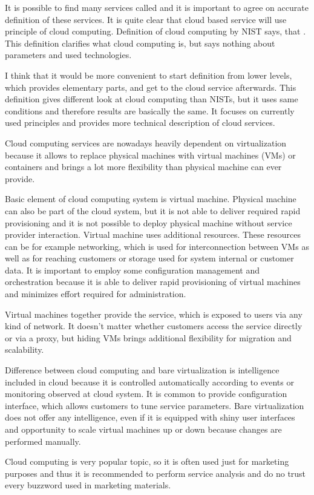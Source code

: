 
It is possible to find many services called  and it is important to agree on accurate definition of these services. It is quite clear that cloud based service will use principle of cloud computing. Definition of cloud computing by \Ac{NIST} says, that  \cite{cloud-definition}. This definition clarifies what cloud computing is, but says nothing about parameters and used technologies.

I think that it would be more convenient to start definition from lower levels, which provides elementary parts, and get to the cloud service afterwards. This definition gives different look at cloud computing than \Ac{NIST}s, but it uses same conditions and therefore results are basically the same. It focuses on currently used principles and provides more technical description of cloud services.

Cloud computing services are nowadays heavily dependent on virtualization because it allows to replace physical machines with virtual machines (\Ac{VM}s) or containers and brings a lot more flexibility than physical machine can ever provide.

Basic element of cloud computing system is virtual machine. Physical machine can also be part of the cloud system, but it is not able to deliver required rapid provisioning and it is not possible to deploy physical machine without service provider interaction. Virtual machine uses additional resources. These resources can be for example networking, which is used for interconnection between \Ac{VM}s as well as for reaching customers or storage used for system internal or customer data. It is important to employ some configuration management and orchestration because it is able to deliver rapid provisioning of virtual machines and minimizes effort required for administration.

Virtual machines together provide the service, which is exposed to users via any kind of network. It doesn't matter whether customers access the service directly or via a proxy, but hiding \Ac{VM}s brings additional flexibility for migration and scalability. 

Difference between cloud computing and bare virtualization is intelligence included in cloud because it is controlled automatically according to events or monitoring observed at cloud system. It is common to provide configuration interface, which allows customers to tune service parameters.
Bare virtualization does not offer any intelligence, even if it is equipped with shiny user interfaces and opportunity to scale virtual machines up or down because changes are performed manually.

Cloud computing is very popular topic, so it is often used just for marketing purposes and thus it is recommended to perform service analysis and do no trust every buzzword used in marketing materials.
